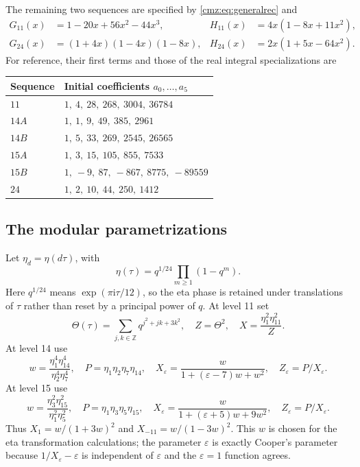 \documentclass[11pt,letterpaper]{article}
\numberwithin{equation}{section}
\theoremstyle{definition}\newtheorem{definition}[theorem]{Definition}
\theoremstyle{remark}\newtheorem{remark}[theorem]{Remark}
\newcommand{\eps}{\varepsilon}
\newcommand{\ii}{\mathrm i}
\newcommand{\Z}{\mathbb Z}
\begin{document}
The remaining two sequences are specified by \eqref{cmz:eq:generalrec} and
\begin{align}
G_{11}(x)&=1-20x+56x^2-44x^3,&
H_{11}(x)&=4x(1-8x+11x^2),\label{cmz:eq:11data}\\
G_{24}(x)&=(1+4x)(1-4x)(1-8x),&
H_{24}(x)&=2x(1+5x-64x^2).
\label{cmz:eq:24data}
\end{align}
For reference, their first terms and those of the real integral specializations are
\begin{center}
\begin{tabular}{ll}
\toprule
Sequence & Initial coefficients $a_0,\ldots,a_5$\\
\midrule
$11$ & $1,\ 4,\ 28,\ 268,\ 3004,\ 36784$\\
$14A$ & $1,\ 1,\ 9,\ 49,\ 385,\ 2961$\\
$14B$ & $1,\ 5,\ 33,\ 269,\ 2545,\ 26565$\\
$15A$ & $1,\ 3,\ 15,\ 105,\ 855,\ 7533$\\
$15B$ & $1,\ -9,\ 87,\ -867,\ 8775,\ -89559$\\
$24$ & $1,\ 2,\ 10,\ 44,\ 250,\ 1412$\\
\bottomrule
\end{tabular}
\end{center}

\subsection{The modular parametrizations}
Let $\eta_d=\eta(d\tau)$, with
\[
\eta(\tau)=q^{1/24}\prod_{m\geq1}(1-q^m).
\]
Here $q^{1/24}$ means $\exp(\pi\ii\tau/12)$, so the eta phase is retained under translations of $\tau$ rather than reset by a principal power of $q$.
At level 11 set
\begin{equation}
\Theta(\tau)=\sum_{j,k\in\Z}q^{j^2+jk+3k^2},\quad
Z=\Theta^2,\quad X=\frac{\eta_1^2\eta_{11}^2}{Z}.
\label{cmz:eq:11mod}
\end{equation}
At level 14 use
\begin{equation}
w=\frac{\eta_1^4\eta_{14}^4}{\eta_2^4\eta_7^4},\quad
P=\eta_1\eta_2\eta_7\eta_{14},\quad
X_\eps=\frac{w}{1+(\eps-7)w+w^2},\quad Z_\eps=P/X_\eps.
\label{cmz:eq:14mod}
\end{equation}
At level 15 use
\begin{equation}
w=\frac{\eta_3^2\eta_{15}^2}{\eta_1^2\eta_5^2},\quad
P=\eta_1\eta_3\eta_5\eta_{15},\quad
X_\eps=\frac{w}{1+(\eps+5)w+9w^2},\quad Z_\eps=P/X_\eps.
\label{cmz:eq:15mod}
\end{equation}
Thus $X_1=w/(1+3w)^2$ and $X_{-11}=w/(1-3w)^2$. This $w$ is chosen for the eta transformation calculations; the parameter $\eps$ is exactly Cooper's parameter because $1/X_\eps-\eps$ is independent of $\eps$ and the $\eps=1$ function agrees.
\end{document}
